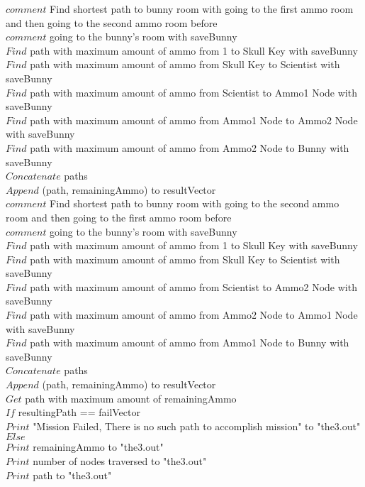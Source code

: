 \documentclass[10pt]{article}
\begin{document}
		$comment$  Find shortest path to bunny room with going to the first ammo room and then going to the second ammo room before  \\
		$comment$ going to the bunny's room with saveBunny \\
		 $Find$ path with maximum amount of ammo from 1 to Skull Key with saveBunny  \\
		 $Find$ path with maximum amount of ammo from Skull Key to Scientist with saveBunny \\
		 $Find$ path with maximum amount of ammo from Scientist to Ammo1 Node with saveBunny \\
		 $Find$ path with maximum amount of ammo from Ammo1 Node to Ammo2 Node with saveBunny \\
		 $Find$ path with maximum amount of ammo from Ammo2 Node to Bunny with saveBunny \\
		$Concatenate$ paths  \\
		$Append$ (path, remainingAmmo) to resultVector \\

		$comment$  Find shortest path to bunny room with going to the second ammo room and then going to the first ammo room before  \\
		$comment$ going to the bunny's room with saveBunny \\
		 $Find$ path with maximum amount of ammo from 1 to Skull Key with saveBunny  \\
		 $Find$ path with maximum amount of ammo from Skull Key to Scientist with saveBunny \\
		 $Find$ path with maximum amount of ammo from Scientist to Ammo2 Node with saveBunny \\
		 $Find$ path with maximum amount of ammo from Ammo2 Node to Ammo1 Node with saveBunny \\
		 $Find$ path with maximum amount of ammo from Ammo1 Node to Bunny with saveBunny \\
		$Concatenate$ paths  \\
		$Append$ (path, remainingAmmo) to resultVector \\

		$Get$ path with maximum amount of remainingAmmo \\

		$If$ resultingPath == failVector \\
			$Print$ "Mission Failed, There is no such path to accomplish mission" to "the3.out"  \\

		$Else$ \\
			$Print$ remainingAmmo to "the3.out" \\
			$Print$ number of nodes traversed to "the3.out" \\
			$Print$ path to "the3.out" \\
\end{document}
